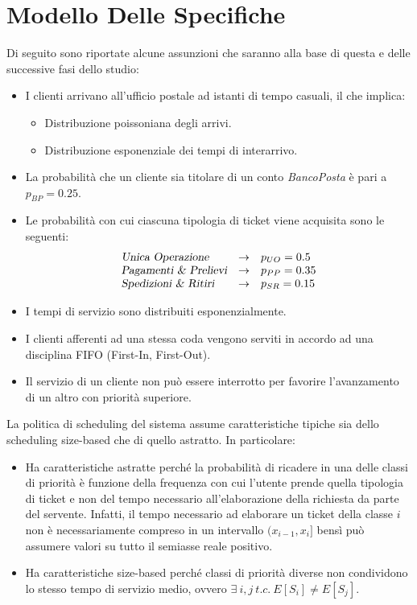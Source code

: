 \section{Modello Delle Specifiche}\label{sec:modello-specfiche}
Di seguito sono riportate alcune assunzioni che saranno alla base di questa e delle successive fasi dello studio:
\begin{itemize}
\item I clienti arrivano all'ufficio postale ad istanti di tempo casuali, il che implica:
\begin{itemize}
\item Distribuzione poissoniana degli arrivi.
\item Distribuzione esponenziale dei tempi di interarrivo.
\end{itemize}
\item La probabilità che un cliente sia titolare di un conto \textsl{BancoPosta} è pari a $p_{BP} = 0.25$.
\item Le probabilità con cui ciascuna tipologia di ticket viene acquisita sono le seguenti:
\begin{equation*}
\begin{array}{l c l}
\textsl{Unica Operazione}{} & \rightarrow & p_{UO} = 0.5 \\
\textsl{Pagamenti \& Prelievi}{} & \rightarrow & p_{PP} = 0.35 \\
\textsl{Spedizioni \& Ritiri}{} & \rightarrow & p_{SR} = 0.15
\end{array}
\end{equation*} 
\item I tempi di servizio sono distribuiti esponenzialmente.
\item I clienti afferenti ad una stessa coda vengono serviti in accordo ad una disciplina FIFO (First-In, First-Out).
\item Il servizio di un cliente non può essere interrotto per favorire l'avanzamento di un altro con priorità superiore.
\end{itemize}

La politica di scheduling del sistema assume caratteristiche tipiche sia dello scheduling size-based che di quello astratto. In particolare:
\begin{itemize}
\item Ha caratteristiche astratte perché la probabilità di ricadere in una delle classi di priorità è funzione della frequenza con cui l'utente prende quella tipologia di ticket e non del tempo necessario all'elaborazione della richiesta da parte del servente. Infatti, il tempo necessario ad elaborare un ticket della classe $i$ non è necessariamente compreso in un intervallo $(x_{i-1}, x_i]$ bensì può assumere valori su tutto il semiasse reale positivo. 
\item Ha caratteristiche size-based perché classi di priorità diverse non condividono lo stesso tempo di servizio medio, ovvero $\exists\ i,j\ t.c.\ E[S_i] \neq E[S_j]$.
\end{itemize}


